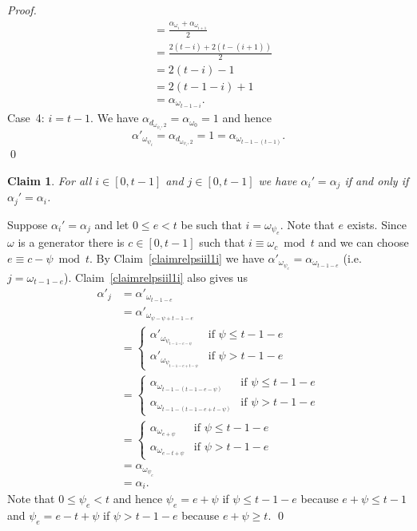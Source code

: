 \documentclass{article}
\newtheorem{claim}{Claim}
\begin{document}
\begin{proof}
\begin{align*}
&= \frac{\alpha_{\omega_i} + \alpha_{\omega_{i+1}}}{2}\\
&= \frac{2(t-i) + 2(t-(i+1))}{2}\\
&= 2(t-i)-1\\
&= 2(t-1-i)+1\\
&= \alpha_{\omega_{t-1-i}}.
\end{align*}
Case~4: $i=t-1$. We have $\alpha_{d_{\omega_{\psi_i},2}} = \alpha_{\omega_0} = 1$ and hence
\begin{displaymath}
\alpha'_{\omega_{\psi_i}} = \alpha_{d_{\omega_{\psi_i},2}} = 1 = \alpha_{\omega_{t-1-(t-1)}}.
\end{displaymath}
\qed

\begin{claim}\label{claimrelalphaialphaj}
For all $i \in [0,t-1]$ and $j \in [0,t-1]$ we have $\alpha_i' = \alpha_j$ if and only if $\alpha_j' = \alpha_i$.
\end{claim}
Suppose $\alpha_i' = \alpha_j$ and let $0 \leq e < t$ be such that $i = \omega_{\psi_e}$. Note that $e$ exists. Since $\omega$ is a generator there is $c \in [0,t-1]$ such that $i \equiv \omega_c \bmod t$ and we can choose $e \equiv c - \psi \bmod t$. By Claim~\ref{claimrelpsiil1i} we have $\alpha'_{\omega_{\psi_e}} = \alpha_{\omega_{t-1-e}}$ (i.e. $j = \omega_{t-1-e}$). Claim~\ref{claimrelpsiil1i} also gives us
\begin{align*}
\alpha'_j &= \alpha'_{\omega_{t-1-e}}\\
&= \alpha'_{\omega_{\psi-\psi+t-1-e}}\\
&= \begin{cases}
\alpha'_{\omega_{\psi_{t-1-e-\psi}}} & \text{if } \psi \leq t-1-e\\
\alpha'_{\omega_{\psi_{t-1-e+t-\psi}}} & \text{if } \psi > t-1-e
\end{cases}\\
&= \begin{cases}
\alpha_{\omega_{t-1-(t-1-e-\psi)}} & \text{if } \psi \leq t-1-e\\
\alpha_{\omega_{t-1-(t-1-e+t-\psi)}} & \text{if } \psi > t-1-e
\end{cases}\\
&= \begin{cases}
\alpha_{\omega_{e+\psi}} & \text{if } \psi \leq t-1-e\\
\alpha_{\omega_{e-t+\psi}} & \text{if } \psi > t-1-e
\end{cases}\\
&= \alpha_{\omega_{\psi_e}}\\
&= \alpha_i.
\end{align*}
Note that $0 \leq \psi_e < t$ and hence $\psi_e = e + \psi$ if $\psi \leq t-1-e$ because $e + \psi \leq t-1$ and $\psi_e = e - t + \psi$ if $\psi > t-1-e$ because $e+\psi \geq t$.
\qed


\end{proof}
\end{document}
